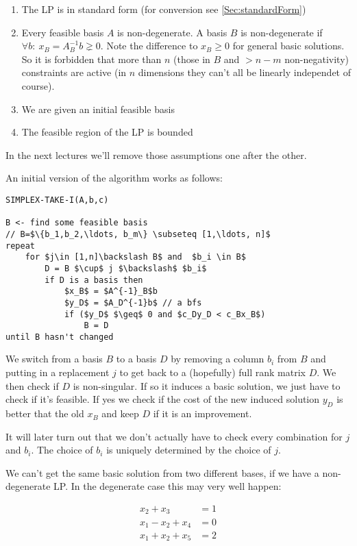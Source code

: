 \begin{enumerate}
\item The LP is in standard form (for conversion see \ref{Sec:standardForm})
\item Every feasible basis $A$ is non-degenerate. A basis $B$ is non-degenerate if $\forall b:\ x_B=A^{-1}_Bb \gneq 0$. Note the difference to $x_B\geq 0$ for general basic solutions. So it is forbidden that more than $n$ (those in $B$ and $>n-m$ non-negativity) constraints are active (in $n$ dimensions they can't all be linearly independet of course). 
\item We are given an initial feasible basis
\item The feasible region of the LP is bounded
\end{enumerate}

In the next lectures we'll remove those assumptions one after the other.

An initial version of the algorithm works as follows:
\begin{lstlisting}
SIMPLEX-TAKE-I(A,b,c)

B <- find some feasible basis
// B=$\{b_1,b_2,\ldots, b_m\} \subseteq [1,\ldots, n]$
repeat 
    for $j\in [1,n]\backslash B$ and  $b_i \in B$
        D = B $\cup$ j $\backslash$ $b_i$
        if D is a basis then
            $x_B$ = $A^{-1}_B$b
            $y_D$ = $A_D^{-1}b$ // a bfs
            if ($y_D$ $\geq$ 0 and $c_Dy_D < c_Bx_B$)
                B = D
until B hasn't changed                
\end{lstlisting}

We switch from a basis $B$ to a basis $D$ by removing a column $b_i$ from $B$ and putting in a replacement $j$ to get back to a (hopefully) full rank matrix $D$. We then check if $D$ is non-singular. If so it induces a basic solution, we just have to check if it's feasible. If yes we check if the cost of the new induced solution $y_D$ is better that the old $x_B$ and keep $D$ if it is an improvement.

It will later turn out that we don't actually have to check every combination for $j$ and $b_i$. The choice of $b_i$ is uniquely determined by the choice of $j$.

We can't get the same basic solution from two different bases, if we have a non-degenerate LP. In the degenerate case this may very well happen:

\begin{align*}
x_2 + x_3 &= 1\\
x_1 - x_2 +x_4 &=0\\
x_1 + x_2 +x_5 &= 2\\
\end{align*}

